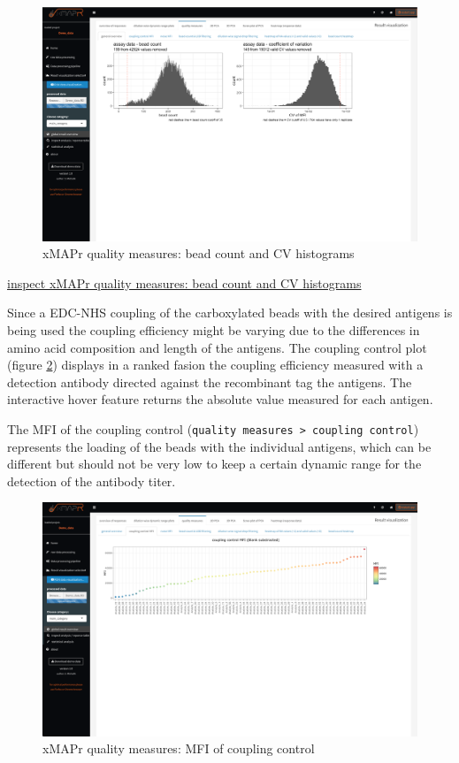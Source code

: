 \documentclass[]{book}
\theoremstyle{definition}
\theoremstyle{definition}
\theoremstyle{definition}
\theoremstyle{remark}
\begin{document}
\begin{figure}
\includegraphics[width=50.47in]{figures/quality_measures__general_overview} \caption{xMAPr quality measures: bead count and CV histograms}\label{fig:beadCountCVhist}
\end{figure}

\href{figures/quality_measures__general_overview.png}{inspect xMAPr
quality measures: bead count and CV histograms}

Since a EDC-NHS coupling of the carboxylated beads with the desired
antigens is being used the coupling efficiency might be varying due to
the differences in amino acid composition and length of the antigens.
The coupling control plot (figure \ref{fig:MFIcouplingControl}) displays
in a ranked fasion the coupling efficiency measured with a detection
antibody directed against the recombinant tag the antigens. The
interactive hover feature returns the absolute value measured for each
antigen.

The MFI of the coupling control
(\texttt{quality\ measures\ \textgreater{}\ coupling\ control})
represents the loading of the beads with the individual antigens, which
can be different but should not be very low to keep a certain dynamic
range for the detection of the antibody titer.

\begin{figure}
\includegraphics[width=50.47in]{figures/quality_measures__coupling_control_MFI} \caption{xMAPr quality measures: MFI of coupling control}\label{fig:MFIcouplingControl}
\end{figure}
\end{document}
